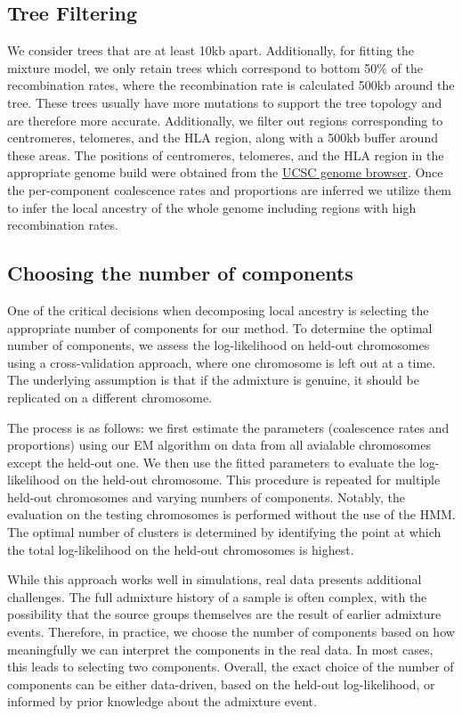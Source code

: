 \subsection{Tree Filtering}

We consider trees that are at least 10kb apart.
%
Additionally, for fitting the mixture model, we only retain trees which correspond to bottom 50\% of the recombination rates, where the recombination rate is calculated 500kb around the tree.
%
These trees usually have more mutations to support the tree topology and are therefore more accurate.
%
Additionally, we filter out regions corresponding to centromeres, telomeres, and the HLA region, along with a 500kb buffer around these areas. The positions of centromeres, telomeres, and the HLA region in the appropriate genome build were obtained from the \href{https://genome.ucsc.edu/goldenPath/help/ftp.html}{UCSC genome browser}.
%
Once the per-component coalescence rates and proportions are inferred we utilize them to infer the local ancestry of the whole genome including regions with high recombination rates.

\subsection{Choosing the number of components}
\label{sec:ch2-gb-selecting-clusters}

One of the critical decisions when decomposing local ancestry is selecting the appropriate number of components for our method. To determine the optimal number of components, we assess the log-likelihood on held-out chromosomes using a cross-validation approach, where one chromosome is left out at a time. The underlying assumption is that if the admixture is genuine, it should be replicated on a different chromosome.

The process is as follows: we first estimate the parameters (coalescence rates and proportions) using our EM algorithm on data from all avialable chromosomes except the held-out one. We then use the fitted parameters to evaluate the log-likelihood on the held-out chromosome. This procedure is repeated for multiple held-out chromosomes and varying numbers of components. Notably, the evaluation on the testing chromosomes is performed without the use of the HMM. The optimal number of clusters is determined by identifying the point at which the total log-likelihood on the held-out chromosomes is highest.

While this approach works well in simulations, real data presents additional challenges. The full admixture history of a sample is often complex, with the possibility that the source groups themselves are the result of earlier admixture events. Therefore, in practice, we choose the number of components based on how meaningfully we can interpret the components in the real data. In most cases, this leads to selecting two components. Overall, the exact choice of the number of components can be either data-driven, based on the held-out log-likelihood, or informed by prior knowledge about the admixture event.

